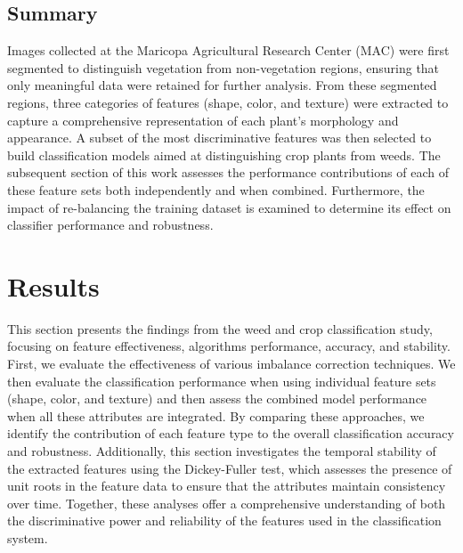 \documentclass[letterpaper, notitlepage]{report}
\begin{document}
\section{Summary}
Images collected at the Maricopa Agricultural Research Center (MAC) were first segmented to distinguish vegetation from non-vegetation regions, ensuring that only meaningful data were retained for further analysis. From these segmented regions, three categories of features (shape, color, and texture) were extracted to capture a comprehensive representation of each plant’s morphology and appearance. A subset of the most discriminative features was then selected to build classification models aimed at distinguishing crop plants from weeds. The subsequent section of this work assesses the performance contributions of each of these feature sets both independently and when combined. Furthermore, the impact of re-balancing the training dataset is examined to determine its effect on classifier performance and robustness.

%
%

\chapter{Results}
\label{section:results}
This section presents the findings from the weed and crop classification study, focusing on feature effectiveness, algorithms performance, accuracy, and stability. First, we evaluate the effectiveness of various imbalance correction techniques.  We then evaluate the classification performance when using individual feature sets (shape, color, and texture) and then assess the combined model performance when all these attributes are integrated. By comparing these approaches, we identify the contribution of each feature type to the overall classification accuracy and robustness. Additionally, this section investigates the temporal stability of the extracted features using the Dickey-Fuller test, which assesses the presence of unit roots in the feature data to ensure that the attributes maintain consistency over time. Together, these analyses offer a comprehensive understanding of both the discriminative power and reliability of the features used in the classification system.
\end{document}

